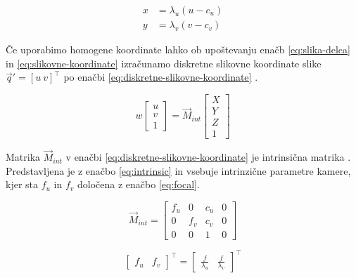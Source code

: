 \begin{subequations}
\begin{align}
	x &= \lambda_u (u - c_u) \\
    y &= \lambda_v (v - c_v)
\end{align}
\label{eq:slikovne-koordinate}
\end{subequations}

Če uporabimo homogene koordinate lahko ob upoštevanju enačb \eqref{eq:slika-delca} in \eqref{eq:slikovne-koordinate} izračunamo diskretne slikovne koordinate slike $\vec{q}' = \left[ u~ v \right]^\top$ po enačbi \eqref{eq:diskretne-slikovne-koordinate} \cite{trucco1998introductory}.


\begin{equation}
	w \begin{bmatrix}
	u \\ v \\ 1
	\end{bmatrix} = \vec{M}_{int}
    \begin{bmatrix}
    X \\ Y \\ Z \\ 1
    \end{bmatrix}
    \label{eq:diskretne-slikovne-koordinate}
\end{equation}

Matrika $\vec{M}_{int}$ v enačbi \eqref{eq:diskretne-slikovne-koordinate} je intrinsična matrika \cite{trucco1998introductory}. Predstavljena je z enačbo \eqref{eq:intrinsic} in vsebuje intrinzične parametre kamere, kjer sta $f_u$ in $f_v$ določena z enačbo \eqref{eq:focal}.

\begin{equation}
\vec{M}_{int} = \begin{bmatrix}
	f_u & 0 & c_u & 0 \\
    0 & f_v & c_v & 0 \\
    0 & 0 & 1 & 0
\end{bmatrix}
\label{eq:intrinsic}
\end{equation}

\begin{equation}
\begin{bmatrix}
	f_u & f_v
\end{bmatrix}^\top = \begin{bmatrix}
	\frac{f}{\lambda_u} & \frac{f}{\lambda_v}
\end{bmatrix}^\top
\label{eq:focal}
\end{equation}


